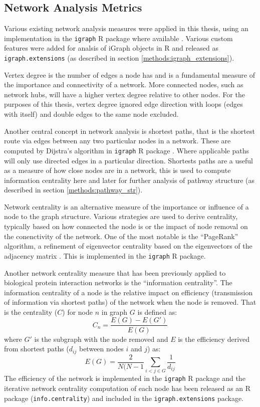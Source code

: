 \subsection{Network Analysis Metrics} \label{methods:network_metrics}
Various existing network analysis measures were applied in this thesis, using an implementation in the \texttt{igraph} R package where available \cite{igraph}. Various custom features were added for analsis of iGraph objects in R and released as \texttt{igraph.extensions} (as described in section \ref{methods:igraph_extensions}).

Vertex degree is the number of edges a node has and is a fundamental measure of the importance and connectivity of a network. More connected nodes, such as network hubs, will have a higher vertex degree relative to other nodes. For the purposes of this thesis, vertex degree ignored edge direction with loops (edges with itself) and double edges to the same node excluded.

Another central concept in network analysis is shortest paths, that is the shortest route via edges between any two particular nodes in a network. These are computed by Dijstra's algorithm in \texttt{igraph} R package \cite{igraph}. Where applicable paths will only use directed edges in a particular direction. Shortests paths are a useful as a measure of how close nodes are in a network, this is used to compute information centrality here and later for further analysis of pathway structure (as described in section \ref{methods:pathway_str}).

Network centrality is an alternative measure of the importance or influence of a node to the graph structure. Various strategies are used to derive centrality,  typically based on how connected the node is or the impact of node removal on the conenctivity of the network. One of the most notable is the ``PageRank'' algorithm, a refinement of eigenvector centrality based on the eigenvectors of the adjacency matrix \cite{Brin1998}. This is implemented in the \texttt{igraph} R package.

Another network centrality measure that has been previously applied to biological protein interaction networks \cite{Kranthi2013} is the ``information centrality''. The information centrality of a node is the relative impact on efficiency (transmission of information via shortest paths) of the network when the node is removed. That is the centrality ($C$) \cite{Kranthi2013} for node $n$ in graph $G$ is defined as: $$C_n = \frac{E(G)-E(G')}{E(G)}$$ where $G'$ is the subgraph with the node removed and $E$ is the efficiency \cite{Latora2001} derived from shortest paths ($d_{ij}$ between nodes $i$ and $j$) as: $$E(G) = \frac{2}{N(N-1} \sum_{i<j \in G}^{} \frac{1}{d_{ij}}$$ The efficiency of the network is implemented in the \texttt{igraph} R package and the iterative network centrality computation of each node has been released as an R package (\texttt{info.centrality}) and included in the \texttt{igraph.extensions} package.

